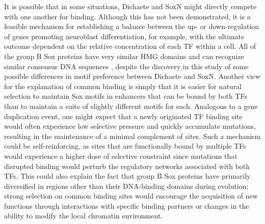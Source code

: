 It is possible that in some situations, Dichaete and SoxN might directly compete with one another for binding. Although this has not been demonstrated, it is a feasible mechanism for establishing a balance between the up- or down-regulation of genes promoting neuroblast differentiation, for example, with the ultimate outcome dependent on the relative concentration of each TF within a cell. All of the group B Sox proteins have very similar HMG domains and can recognize similar consensus DNA sequences \citep{mckimmie_conserved_2005}, despite the discovery in this study of some possible differences in motif preference between Dichaete and SoxN. Another view for the explanation of common binding is simply that it is easier for natural selection to maintain Sox motifs in enhancers that can be bound by both TFs than to maintain a suite of slightly different motifs for each. Analogous to a gene duplication event, one might expect that a newly originated TF binding site would often experience low selective pressure and quickly accumulate mutations, resulting in the maintenance of a minimal complement of sites. Such a mechanism could be self-reinforcing, as sites that are functionally bound by multiple TFs would experience a higher dose of selective constraint since mutations that disrupted binding would perturb the regulatory networks associated with both TFs. This could also explain the fact that group B Sox proteins have primarily diversified in regions other than their DNA-binding domains during evolution; strong selection on common binding sites would encourage the acquisition of new functions through interactions with specific binding partners or changes in the ability to modify the local chromatin environment.

